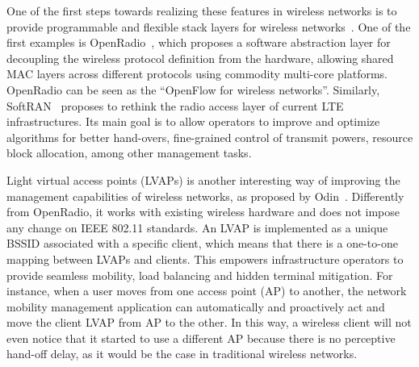 
One of the first steps towards realizing these features in wireless networks is to provide programmable and 
flexible stack layers for wireless networks~\cite{bansal2012,gudipati2013}.
One of the first examples is OpenRadio~\cite{bansal2012}, which proposes a software 
abstraction layer for decoupling the wireless protocol definition from the hardware, allowing shared MAC 
layers across different protocols using commodity multi-core platforms. OpenRadio can be seen as the 
``OpenFlow for wireless networks''. Similarly, SoftRAN~\cite{gudipati2013} proposes to rethink 
the radio access layer of current LTE infrastructures. Its main goal is to allow operators to improve and 
optimize algorithms for better hand-overs, fine-grained control of transmit powers, resource block allocation, 
among other management tasks.

Light virtual access points (LVAPs) is another interesting way of improving the management capabilities of 
wireless networks, as proposed by Odin~\cite{suresh2012}. Differently from OpenRadio, 
it works with existing wireless hardware and does not impose any change on IEEE 802.11 standards. An LVAP is 
implemented as a unique BSSID associated with a specific client, which means that there is a one-to-one mapping 
between LVAPs and clients. This empowers infrastructure operators to provide seamless mobility, load balancing 
and hidden terminal mitigation. For instance, when a user moves from one access point (AP) to another, the 
network mobility management application can automatically and proactively act and move the client LVAP from 
AP to the other. In this way, a wireless client will not even notice that it started to use a different AP 
because there is no perceptive hand-off delay, as it would be the case in traditional wireless networks.


